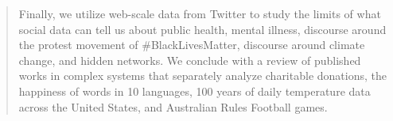 \begin{abstract}
Finally, we utilize web-scale data from Twitter to study the limits of what social data can tell us about public health, mental illness, discourse around the protest movement of \#BlackLivesMatter, discourse around climate change, and hidden networks.
We conclude with a review of published works in complex systems that separately analyze charitable donations, the happiness of words in 10 languages, 100 years of daily temperature data across the United States, and Australian Rules Football games.

\end{abstract}
